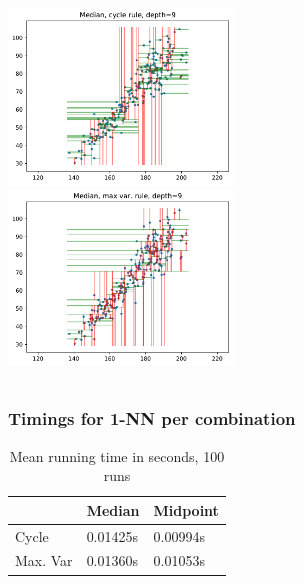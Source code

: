 \documentclass{beamer}
\begin{document}
\begin{frame}
	\begin{columns}[t]
		\centering
		\includegraphics[width=6cm]{graphics/median_cycle}\\
		\centering
		\includegraphics[width=6cm]{graphics/median_maxvar}\\
	\end{columns}
\end{frame}


\begin{frame}
\frametitle{Timings for 1-NN per combination}
\begin{table}[]
	\centering
	\label{my-label}
	\begin{tabular}{l|l|l}
		& Median          & Midpoint        \\ \hline
		Cycle    & 0.01425s & 0.00994s \\ \hline
		Max. Var & 0.01360s & 0.01053s \\ 
	\end{tabular}
	\caption{Mean running time in seconds, 100 runs}
\end{table}
\end{frame}


%
%

\end{document}
